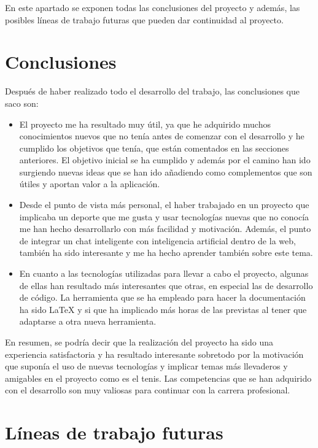 
En este apartado se exponen todas las conclusiones del proyecto y además, las posibles líneas de trabajo futuras que pueden dar continuidad al proyecto.

\section{Conclusiones}\label{conclusiones}

Después de haber realizado todo el desarrollo del trabajo, las conclusiones que saco son:

\begin{itemize}
    \item El proyecto me ha resultado muy útil, ya que he adquirido muchos conocimientos nuevos que no tenía antes de comenzar con el desarrollo y he cumplido los objetivos que tenía, que están comentados en las secciones anteriores. El objetivo inicial se ha cumplido y además por el camino han ido surgiendo nuevas ideas que se han ido añadiendo como complementos que son útiles y aportan valor a la aplicación.
    \item Desde el punto de vista más personal, el haber trabajado en un proyecto que implicaba un deporte que me gusta y usar tecnologías nuevas que no conocía me han hecho desarrollarlo con más facilidad y motivación. Además, el punto de integrar un chat inteligente con inteligencia artificial dentro de la web, también ha sido interesante y me ha hecho aprender también sobre este tema.
    \item En cuanto a las tecnologías utilizadas para llevar a cabo el proyecto, algunas de ellas han resultado más interesantes que otras, en especial las de desarrollo de código. La herramienta que se ha empleado para hacer la documentación ha sido LaTeX y si que ha implicado más horas de las previstas al tener que adaptarse a otra nueva herramienta.
\end{itemize}

En resumen, se podría decir que la realización del proyecto ha sido una experiencia satisfactoria y ha resultado interesante sobretodo por la motivación que suponía el uso de nuevas tecnologías y implicar temas más llevaderos y amigables en el proyecto como es el tenis. Las competencias que se han adquirido con el desarrollo son muy valiosas para continuar con la carrera profesional.


\section{Líneas de trabajo futuras}\label{lineas-de-trabajo-futuras}

